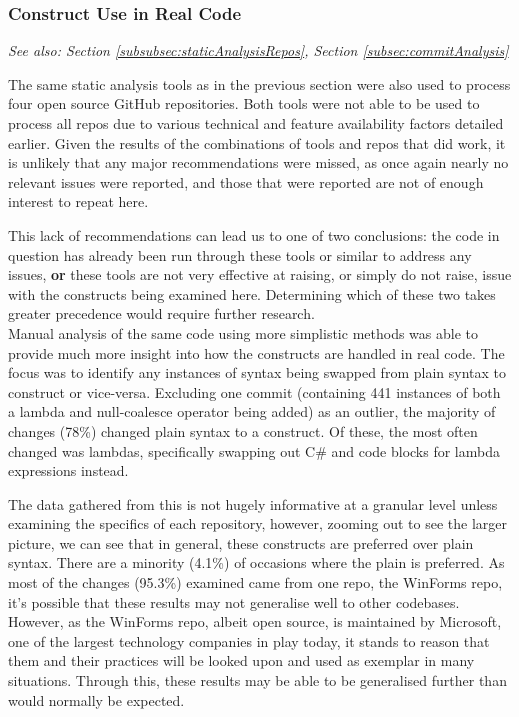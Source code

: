 \documentclass{article}
\begin{document}
        \subsubsection{Construct Use in Real Code}
            \textit{See also: Section \ref{subsubsec:staticAnalysisRepos}, Section \ref{subsec:commitAnalysis}}
            \newline

            \noindent The same static analysis tools as in the previous section were also used to process four open source GitHub repositories. Both tools were not able to be used to process all repos due to various technical and feature availability factors detailed earlier. Given the results of the combinations of tools and repos that did work, it is unlikely that any major recommendations were missed, as once again nearly no relevant issues were reported, and those that were reported are not of enough interest to repeat here.
            
            This lack of recommendations can lead us to one of two conclusions: the code in question has already been run through these tools or similar to address any issues, \textbf{or} these tools are not very effective at raising, or simply do not raise, issue with the constructs being examined here. Determining which of these two takes greater precedence would require further research.
            \\

            Manual analysis of the same code using more simplistic methods was able to provide much more insight into how the constructs are handled in real code. The focus was to identify any instances of syntax being swapped from plain syntax to construct or vice-versa. Excluding one commit (containing 441 instances of both a lambda and null-coalesce operator being added) as an outlier, the majority of changes (78\%) changed plain syntax to a construct. Of these, the most often changed was lambdas, specifically swapping out C\#  and  code blocks for lambda expressions instead.

            The data gathered from this is not hugely informative at a granular level unless examining the specifics of each repository, however, zooming out to see the larger picture, we can see that in general, these constructs are preferred over plain syntax. There are a minority (4.1\%) of occasions where the plain is preferred. As most of the changes (95.3\%) examined came from one repo, the WinForms repo, it's possible that these results may not generalise well to other codebases. However, as the WinForms repo, albeit open source, is maintained by Microsoft, one of the largest technology companies in play today, it stands to reason that them and their practices will be looked upon and used as exemplar in many situations. Through this, these results may be able to be generalised further than would normally be expected.
\end{document}
